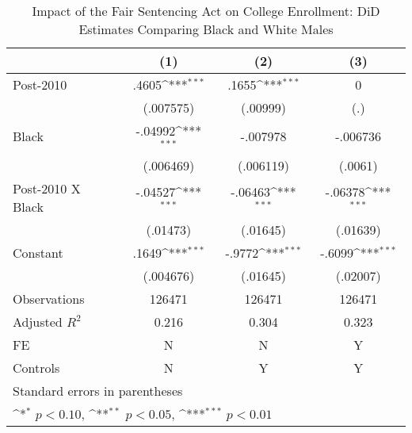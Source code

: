 \begin{table}[htbp]\centering
\def\sym#1{\ifmmode^{#1}\else\(^{#1}\)\fi}
\caption{Impact of the Fair Sentencing Act on College Enrollment: DiD Estimates Comparing Black and White Males}
\begin{tabular}{l*{3}{c}}
\hline\hline
                    &\multicolumn{1}{c}{(1)}         &\multicolumn{1}{c}{(2)}         &\multicolumn{1}{c}{(3)}         \\
\hline
Post-2010           &       .4605\sym{***}&       .1655\sym{***}&           0         \\
                    &   (.007575)         &    (.00999)         &         (.)         \\
[1em]
Black               &     -.04992\sym{***}&    -.007978         &    -.006736         \\
                    &   (.006469)         &   (.006119)         &     (.0061)         \\
[1em]
Post-2010 X Black   &     -.04527\sym{***}&     -.06463\sym{***}&     -.06378\sym{***}\\
                    &    (.01473)         &    (.01645)         &    (.01639)         \\
[1em]
Constant            &       .1649\sym{***}&      -.9772\sym{***}&      -.6099\sym{***}\\
                    &   (.004676)         &    (.01645)         &    (.02007)         \\
\hline
Observations        &      126471         &      126471         &      126471         \\
Adjusted \(R^{2}\)  &       0.216         &       0.304         &       0.323         \\
FE                  &           N         &           N         &           Y         \\
Controls            &           N         &           Y         &           Y         \\
\hline\hline
\multicolumn{4}{l}{\footnotesize Standard errors in parentheses}\\
\multicolumn{4}{l}{\footnotesize \sym{*} \(p<0.10\), \sym{**} \(p<0.05\), \sym{***} \(p<0.01\)}\\
\end{tabular}
\end{table}
